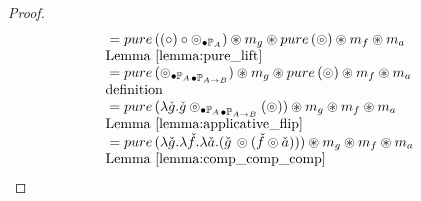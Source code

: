 \begin{proof}
$$\begin{array}{ll}
{}=   \apure\, ((\comp) \comp \clift{\pappl}{\pstream{A}}) \appl m_g \appl \apure\, (\pappl) \appl m_f \appl m_a\\
 \mbox{Lemma \ref{lemma:pure_lift}}\\
{}=    \apure\, (\clift{\clift{\pappl}{\pstream{A}}}{\pstream{A\rightarrow B}}) \appl m_g \appl \apure\, (\pappl) \appl m_f  \appl m_a\\
 \mbox{definition}\\
{}= \apure\, (\lambda \pstr{g} . \pstr{g} \clift{\clift{\pappl}{\pstream{A}}}{\pstream{A\rightarrow B}} (\pappl) ) \appl m_g  \appl m_f  \appl m_a\\
 \mbox{Lemma \ref{lemma:applicative_flip}}\\
{}=  \apure\, (\lambda \pstr{g} . \lambda \pstr{f}. \lambda \pstr{a} . (\pstr{g}\, \pappl (\pstr{f} \pappl \pstr{a})) ) \appl m_g  \appl m_f  \appl m_a\\
 \mbox{Lemma \ref{lemma:comp_comp_comp}}\\
\end{array}
$$
\end{proof}

\newpage

